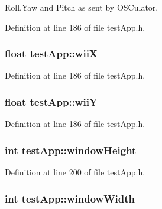 Roll,Yaw and Pitch as sent by O\-S\-Culator. 



Definition at line 186 of file test\-App.\-h.

\hypertarget{group___wii_mote_variables_ga7a77e8633c3a94e3e409a33a5cd9ae3f}{
\subsubsection[{wii\-X}]{\setlength{\rightskip}{0pt plus 5cm}float test\-App\-::wii\-X}}\label{group___wii_mote_variables_ga7a77e8633c3a94e3e409a33a5cd9ae3f}


Definition at line 186 of file test\-App.\-h.

\hypertarget{group___wii_mote_variables_ga5ae41896388ae16ee530beca5333e02a}{
\subsubsection[{wii\-Y}]{\setlength{\rightskip}{0pt plus 5cm}float test\-App\-::wii\-Y}}\label{group___wii_mote_variables_ga5ae41896388ae16ee530beca5333e02a}


Definition at line 186 of file test\-App.\-h.

\hypertarget{group___wii_mote_variables_ga4e8884eeef5b2657b62278969d4e3dcf}{
\subsubsection[{window\-Height}]{\setlength{\rightskip}{0pt plus 5cm}int test\-App\-::window\-Height}}\label{group___wii_mote_variables_ga4e8884eeef5b2657b62278969d4e3dcf}


Definition at line 200 of file test\-App.\-h.

\hypertarget{group___wii_mote_variables_ga9ed611377cd46f5148a3a3d538e96484}{
\subsubsection[{window\-Width}]{\setlength{\rightskip}{0pt plus 5cm}int test\-App\-::window\-Width}}\label{group___wii_mote_variables_ga9ed611377cd46f5148a3a3d538e96484}



